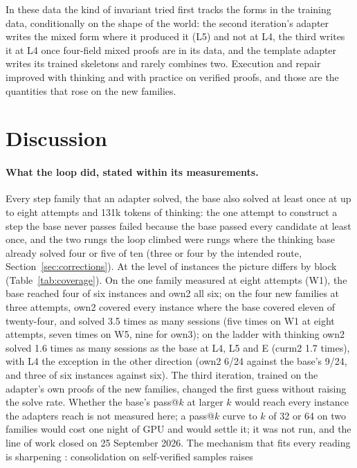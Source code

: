 \documentclass[11pt]{article}
\begin{document}
In these data the kind of invariant tried first tracks the forms in the
training data, conditionally on the shape of the world: the second iteration's adapter writes the mixed form where it produced it (L5) and not at L4, the third writes it at L4 once four-field mixed proofs are in its data, and the template adapter writes its trained skeletons and rarely combines two.
Execution and repair improved with thinking and with practice on verified
proofs, and those are the quantities that rose on the new families.

\section{Discussion}
\label{sec:discussion}

\paragraph{What the loop did, stated within its measurements.} Every step
family that an adapter solved, the base also solved at least once at up
to eight attempts and 131k tokens of thinking: the one attempt to
construct a step the base never passes failed because the base passed
every candidate at least once, and the two rungs the loop climbed were
rungs where the thinking base already solved four or five of ten (three or
four by the intended route, Section~\ref{sec:corrections}). At the
level of instances the picture differs by block (Table~\ref{tab:coverage}).
On the one family measured at eight attempts (W1), the base reached four
of six instances and own2 all six; on the four new families at three
attempts, own2 covered every instance where the base covered eleven of
twenty-four, and solved 3.5 times as many sessions (five times on W1 at
eight attempts, seven times on W5, nine for own3); on the ladder with
thinking own2 solved 1.6 times as many sessions as the base at L4, L5 and
E (curm2 1.7 times), with L4 the
exception in the other direction (own2 6/24 against the base's 9/24, and
three of six instances against six). The third iteration, trained on the
adapter's own proofs of the new families, changed the first guess without
raising the solve rate. Whether the base's pass@$k$ at larger $k$ would
reach every instance the adapters reach is not measured here; a pass@$k$
curve to $k$ of 32 or 64 on two families would cost one night of GPU and would settle it; it was not run, and the line of work closed on 25 September 2026. The mechanism that fits every reading is sharpening
\citep{huang2024sharpening}: consolidation on self-verified samples raises
\end{document}

